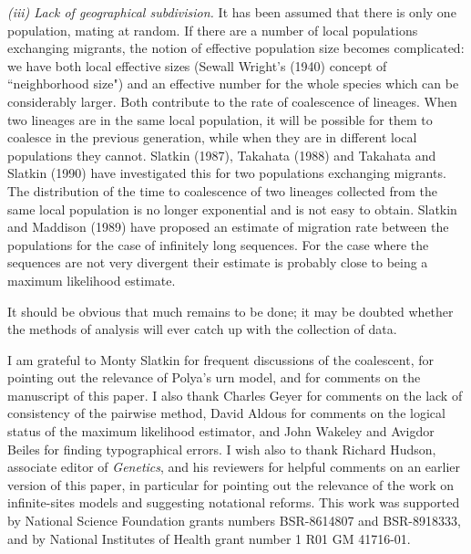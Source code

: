 {\it (iii) Lack of geographical subdivision.}  It has been assumed that there
is only one population, mating at random.  If there are a number of
local populations exchanging migrants, the notion of effective
population size becomes complicated: we have both local effective sizes
(Sewall Wright's (1940) concept of ``neighborhood size") and an
effective number for the whole species which can be considerably larger.
Both contribute to the rate of coalescence of lineages.  When two
lineages are in the same local population, it will be possible for them
to coalesce in the previous generation, while when they are in different
local populations they cannot.  Slatkin (1987), Takahata (1988) and
Takahata and Slatkin (1990)
have investigated this for two populations exchanging
migrants.  The distribution of the time to coalescence of two lineages
collected from the same local population
is no longer exponential and is not easy to obtain.  Slatkin and
Maddison (1989) have proposed an estimate of migration rate between
the populations for the case of infinitely long sequences.  For the case
where the sequences are not very divergent their estimate is probably
close to being a maximum likelihood estimate.

It should be obvious that much remains to be done; it may be doubted
whether the methods of analysis will ever catch up with the collection
of data.

\bigskip

\medskip

{\small I am grateful to Monty Slatkin for frequent discussions of the
coalescent, for pointing out the relevance of Polya's urn model, and for
comments on the manuscript of this paper.
I also thank Charles Geyer for comments on the lack of consistency of
the pairwise method, David Aldous for comments on the logical status
of the maximum likelihood estimator, and John Wakeley and Avigdor Beiles for
finding
typographical errors.   I wish also to thank Richard Hudson, associate editor
of {\it Genetics}, and his reviewers for helpful comments on an earlier
version of this paper, in particular for pointing out the relevance of the
work on infinite-sites models and suggesting notational reforms.  This work
was supported by National Science
Foundation grants numbers BSR-8614807 and BSR-8918333, and by National Institutes of Health grant number 1 R01 GM 41716-01.}

\bigskip

